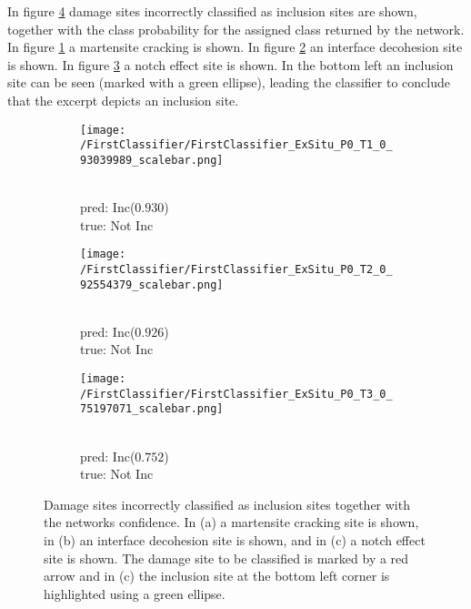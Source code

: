 In figure \ref{fig:InceptionExSituPredictedIncTrueRest} damage sites incorrectly classified as inclusion sites are shown, together with the class probability for the assigned class returned by the network. In figure \ref{sub:MasInc} a martensite cracking is shown. In figure \ref{sub:IDasInc1} an interface decohesion site is shown. In figure \ref{sub:IDasInc2} a notch effect site is shown. In the bottom left an inclusion site can be seen (marked with a green ellipse), leading the classifier to conclude that the excerpt depicts an inclusion site. 



\begin{figure}[H]
\centering
\begin{subfigure}{.3\textwidth}
\texttt{[image: /FirstClassifier/FirstClassifier\_ExSitu\_P0\_T1\_0\_93039989\_scalebar.png]}
\caption{\\pred: Inc($0.930$) \\true: Not Inc}
\label{sub:MasInc}
\end{subfigure}
\centering
\begin{subfigure}{.3\textwidth}
\texttt{[image: /FirstClassifier/FirstClassifier\_ExSitu\_P0\_T2\_0\_92554379\_scalebar.png]}
\caption{\\pred: Inc($0.926$) \\true: Not Inc}
\label{sub:IDasInc1}
\end{subfigure}
\centering
\begin{subfigure}{.3\textwidth}
\texttt{[image: /FirstClassifier/FirstClassifier\_ExSitu\_P0\_T3\_0\_75197071\_scalebar.png]}
\caption{\\pred: Inc($0.752$) \\true: Not Inc}
\label{sub:IDasInc2}
\end{subfigure}
\caption{Damage sites incorrectly classified as inclusion sites together with the networks confidence. In (a) a martensite cracking site is shown, in (b) an interface decohesion site is shown, and in (c) a notch effect site is shown. The damage site to be classified is marked by a red arrow and in (c) the inclusion site at the bottom left corner is highlighted using a green ellipse.}
\label{fig:InceptionExSituPredictedIncTrueRest}
\end{figure}

